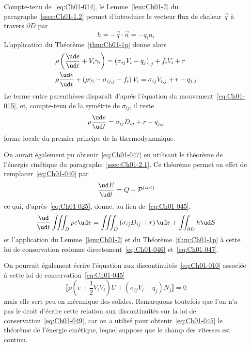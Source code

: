 Compte-tenu de~\eqref{eq:Ch01-014}, le Lemme~\ref{lem:Ch01-2} du paragraphe~\ref{ssec:Ch01-1.2} permet d'introduire le vecteur flux de chaleur $\vec{q}$ à travers $\partial D$ par
\begin{equation}
    h = - \vec{q} \cdot \vec{n} = -q_i n_i
    \label{eq:Ch01-046}
\end{equation}
L'application du Théorème~\ref{thm:Ch01-1p} donne alors
\begin{align*}
    & \rho \left( \frac{\ud e}{\ud t} + V_i \gamma_i \right) = \left( \sigma_{ij} V_i - q_j \right)_{,j} + f_i V_i + r\\
    & \rho \frac{\ud e}{\ud t} + \left( \rho \gamma_i - \sigma_{ij,j} - f_i \right) V_i = \sigma_{ij} V_{i,j} + r - q_{j,j}
\end{align*}
Le terme entre parenthèses disparaît d'après l'équation du mouvement~\eqref{eq:Ch01-015}, et, compte-tenu de la symétrie de $\sigma_{ij}$, il reste
\begin{equation}
    \rho \frac{\ud e }{\ud t} = \sigma_{ij} D_{ij} + r - q_{j,j}
    \label{eq:Ch01-047}
\end{equation}
forme locale du premier principe de la thermodynamique.

On aurait également pu obtenir~\eqref{eq:Ch01-047} en utilisant le théorème de l'énergie cinétique du paragraphe~\ref{ssec:Ch01-2.1}.
Ce théorème permet en effet de remplacer~\eqref{eq:Ch01-040} par
\begin{equation}
    \frac{\ud E}{\ud t} = Q - \mathcal{P}^{(int)}
    \label{eq:Ch01-048}
\end{equation}
ce  qui, d'après~\eqref{eq:Ch01-025}, donne, au lieu de~\eqref{eq:Ch01-045},
\begin{equation}
    \frac{\ud}{\ud t} \iiint_{D} \rho e \ud v = \iiint_{D} \left( \sigma_{ij} D_{ij} + r \right) \ud v + \iint_{\partial D} h \ud S
    \label{eq:Ch01-049}
\end{equation}
et l'application du Lemme~\ref{lem:Ch01-2} et du Théorème~\ref{thm:Ch01-1p} à cette loi de conservation redonne directement~\eqref{eq:Ch01-046} et~\eqref{eq:Ch01-047}.

On pourrait également écrire l'équation aux discontinuités~\eqref{eq:Ch01-010} associée à cette loi de conservation~\eqref{eq:Ch01-045}
\begin{equation}
    \llbracket \rho \left( e + \frac{1}{2} V_i V_i \right) U + \left( \sigma_{ij} V_i + q_j \right) N_j \rrbracket = 0
    \label{eq:Ch01-050}
\end{equation}
mais elle sert peu en mécanique des solides.
Remarquons toutefois que l'on n'a pas le droit d'écrire cette relation aux discontinuités sur la loi de conservation~\eqref{eq:Ch01-049}, car on a utilisé pour obtenir~\eqref{eq:Ch01-045} le théorème de l'énergie cinétique, lequel suppose que le champ des vitesses est continu.

